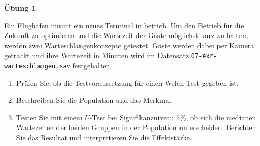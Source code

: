 \documentclass[
]{book}
\providecommand{\tightlist}{%
  \setlength{\itemsep}{0pt}\setlength{\parskip}{0pt}}
\theoremstyle{definition}
\theoremstyle{definition}
\theoremstyle{definition}
\newtheorem{exercise}{Übung}[chapter]
\theoremstyle{definition}
\theoremstyle{remark}
\begin{document}
\begin{exercise}
\protect\hypertarget{exr:warteschlangen}{}\label{exr:warteschlangen}\leavevmode

Ein Flughafen nimmt ein neues Terminal in betrieb. Um den Betrieb für die Zukunft zu optimieren und die Wartezeit der Gäste möglichst kurz zu halten, werden zwei Warteschlangenkonzepte getestet. Gäste werden dabei per Kamera getrackt und ihre Wartezeit in Minuten wird im Datensatz \texttt{07-exr-warteschlangen.sav} festgehalten.

\begin{enumerate}
\def\labelenumi{\alph{enumi})}
\tightlist
\item
  Prüfen Sie, ob die Testvoraussetzung für einen Welch Test gegeben ist.
\item
  Beschreiben Sie die Population und das Merkmal.
\item
  Testen Sie mit einem \(U\)-Test bei Signifikanzniveau \(5\%\), ob sich die medianen Wartezeiten der beiden Gruppen in der Population unterscheiden. Berichten Sie das Resultat und interpretieren Sie die Effektstärke.
\end{enumerate}

\end{exercise}
\end{document}
